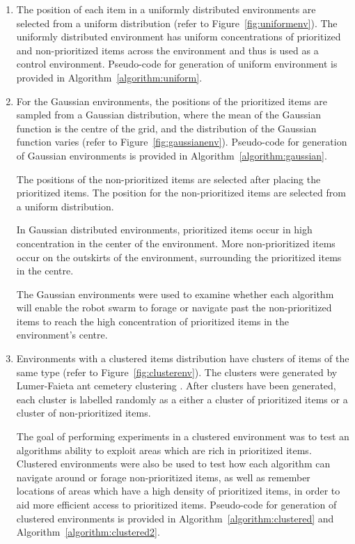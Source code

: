 \begin{enumerate}

\item The position of each item in a uniformly distributed environments are selected from a uniform distribution (refer to Figure~\ref{fig:uniformenv}). The uniformly distributed environment has uniform concentrations of prioritized and non-prioritized items across the environment and thus is used as a control environment. Pseudo-code for generation of uniform environment is provided in Algorithm~\ref{algorithm:uniform}.

\item For the Gaussian environments, the positions of the prioritized items are sampled from a Gaussian distribution, where the mean of the Gaussian function is the centre of the grid, and the distribution of the Gaussian function varies (refer to Figure~\ref{fig:gaussianenv}). Pseudo-code for generation of Gaussian environments is provided in Algorithm~\ref{algorithm:gaussian}.

The positions of the non-prioritized items are selected after placing the prioritized items. The position for the non-prioritized items are selected from a uniform distribution. 

In Gaussian distributed environments, prioritized items  occur in high concentration in the center of the environment. More non-prioritized items occur on the outskirts of the environment, surrounding the prioritized items in the centre.

The Gaussian environments were used to examine whether each algorithm will enable the robot swarm to forage or navigate past the non-prioritized items to reach the high concentration of prioritized items in the environment's centre. 

\item Environments with a clustered items distribution have clusters of items of the same type (refer to Figure~\ref{fig:clusterenv}). The clusters were generated by Lumer-Faieta ant cemetery clustering \cite{lumer1994diversity}. After clusters have been generated, each cluster is labelled randomly as a either a cluster of prioritized items or a cluster of non-prioritized items. 

The goal of performing experiments in a clustered environment was to test an algorithms ability to exploit areas which are rich in prioritized items. Clustered environments were also be used to test how each algorithm can navigate around or forage non-prioritized items, as well as remember locations of areas which have a high density of prioritized items, in order to aid more efficient access to prioritized items.  Pseudo-code for generation of clustered environments is provided in Algorithm~\ref{algorithm:clustered} and Algorithm~\ref{algorithm:clustered2}.



\end{enumerate}
